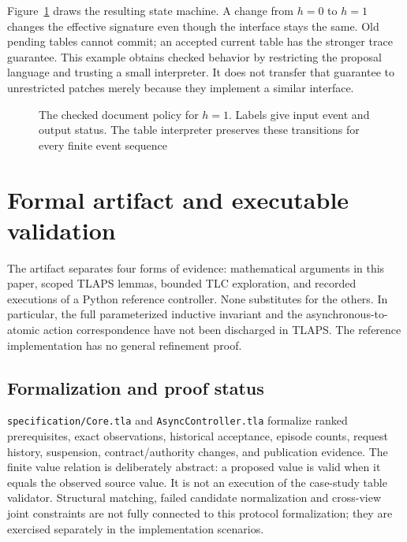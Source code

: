 \documentclass[pdflatex,sn-mathphys-num]{sn-jnl}
\theoremstyle{thmstyleone}
\theoremstyle{thmstylethree}
\theoremstyle{thmstyletwo}
\begin{document}
Figure~\ref{fig:policy} draws the resulting state machine. A change from $h=0$ to $h=1$ changes the effective signature even though the interface stays the same. Old pending tables cannot commit; an accepted current table has the stronger trace guarantee. This example obtains checked behavior by restricting the proposal language and trusting a small interpreter. It does not transfer that guarantee to unrestricted patches merely because they implement a similar interface.
\begin{figure}[tb]
\centering
{}
\caption{The checked document policy for $h=1$. Labels give input event and output status. The table interpreter preserves these transitions for every finite event sequence}\label{fig:policy}
\end{figure}

\section{Formal artifact and executable validation}\label{sec:checking}
The artifact separates four forms of evidence: mathematical arguments in this paper, scoped TLAPS lemmas, bounded TLC exploration, and recorded executions of a Python reference controller. None substitutes for the others. In particular, the full parameterized inductive invariant and the asynchronous-to-atomic action correspondence have not been discharged in TLAPS. The reference implementation has no general refinement proof.

\subsection{Formalization and proof status}
\texttt{specification/Core.tla} and \texttt{AsyncController.tla} formalize ranked prerequisites, exact observations, historical acceptance, episode counts, request history, suspension, contract/authority changes, and publication evidence. The finite value relation is deliberately abstract: a proposed value is valid when it equals the observed source value. It is not an execution of the case-study table validator. Structural matching, failed candidate normalization and cross-view joint constraints are not fully connected to this protocol formalization; they are exercised separately in the implementation scenarios.
\end{document}
